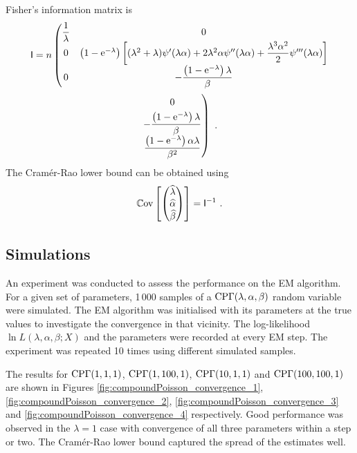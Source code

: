 Fisher's information matrix is
\begin{multline}
  \matr{I}=
  n
  \left(\begin{matrix}
    \dfrac{1}{\lambda} & 0\\
    0 & \left(1-\euler^{-\lambda}\right)\left[(\lambda^2+\lambda)\psi'(\lambda\alpha)+2\lambda^2\alpha\psi''(\lambda\alpha)+\dfrac{\lambda^3\alpha^2}{2}\psi'''(\lambda\alpha)\right]\\
    0 & -\dfrac{\left(1-\euler^{-\lambda}\right)\lambda}{\beta}
  \end{matrix}\right.
  \\
  \left.\begin{matrix}
  \vphantom{\dfrac{1}{\lambda}}0\\
  -\dfrac{\left(1-\euler^{-\lambda}\right)\lambda}{\beta}\\
  \dfrac{\left(1-\euler^{-\lambda}\right)\alpha\lambda}{\beta^2}
  \end{matrix}\right)
  \ .
\end{multline}
The Cram\'er-Rao lower bound can be obtained using
\begin{equation}
  \operatorname{\mathbb{C}ov}\left[
    \begin{pmatrix}
      \widehat{\lambda}\\\widehat{\alpha}\\\widehat{\beta}
    \end{pmatrix}
  \right]
  =
  \mathsf{I}^{-1}
  \ .
\end{equation}

\subsection{Simulations}

An experiment was conducted to assess the performance on the EM algorithm. For a given set of parameters, 1\,000 samples of a $\operatorname{CP\Gamma}(\lambda,\alpha,\beta)$ random variable were simulated. The EM algorithm was initialised with its parameters at the true values to investigate the convergence in that vicinity. The log-likelihood $\ln L(\lambda,\alpha,\beta;X)$ and the parameters were recorded at every EM step. The experiment was repeated 10 times using different simulated samples.

The results for $\operatorname{CP\Gamma}(1,1,1)$, $\operatorname{CP\Gamma}(1,100,1)$, $\operatorname{CP\Gamma}(10,1,1)$ and $\operatorname{CP\Gamma}(100,100,1)$ are shown in Figures \ref{fig:compoundPoisson_convergence_1}, \ref{fig:compoundPoisson_convergence_2}, \ref{fig:compoundPoisson_convergence_3} and \ref{fig:compoundPoisson_convergence_4} respectively. Good performance was observed in the $\lambda=1$ case with convergence of all three parameters within a step or two. The Cram\'er-Rao lower bound captured the spread of the estimates well.

